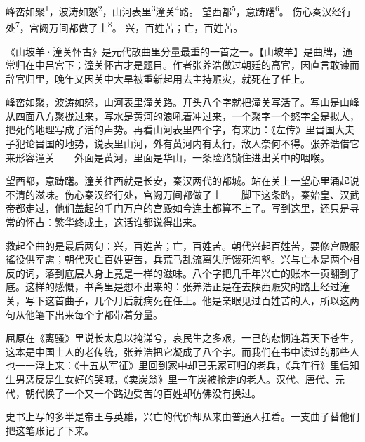 
\begin{poem}
峰峦如聚\textsuperscript{1}，波涛如怒\textsuperscript{2}，山河表里\textsuperscript{3}潼关\textsuperscript{4}路。
望西都\textsuperscript{5}，意踌躇\textsuperscript{6}。
伤心秦汉经行处\textsuperscript{7}，宫阙万间都做了土\textsuperscript{8}。
兴，百姓苦；亡，百姓苦。
\end{poem}

\begin{annotations}
\end{annotations}

\begin{appreciation}
《山坡羊·潼关怀古》是元代散曲里分量最重的一首之一。【山坡羊】是曲牌，通常归在中吕宫下；潼关怀古才是题目。作者张养浩做过朝廷的高官，因直言敢谏而辞官归里，晚年又因关中大旱被重新起用去主持赈灾，就死在了任上。

峰峦如聚，波涛如怒，山河表里潼关路。开头八个字就把潼关写活了。写山是山峰从四面八方聚拢过来，写水是黄河的浪吼着冲过来，一个聚字一个怒字全是拟人，把死的地理写成了活的声势。再看山河表里四个字，有来历：《左传》里晋国大夫子犯论晋国的地势，说表里山河，外有黄河内有太行，敌人奈何不得。张养浩借它来形容潼关——外面是黄河，里面是华山，一条险路锁住进出关中的咽喉。

望西都，意踌躇。潼关往西就是长安，秦汉两代的都城。站在关上一望心里涌起说不清的滋味。伤心秦汉经行处，宫阙万间都做了土——脚下这条路，秦始皇、汉武帝都走过，他们盖起的千门万户的宫殿如今连土都算不上了。写到这里，还只是寻常的怀古：繁华终成土，这话谁都说得出来。

救起全曲的是最后两句：兴，百姓苦；亡，百姓苦。朝代兴起百姓苦，要修宫殿服徭役供军需；朝代灭亡百姓更苦，兵荒马乱流离失所饿死沟壑。兴与亡本是两个相反的词，落到底层人身上竟是一样的滋味。八个字把几千年兴亡的账本一页翻到了底。这样的感慨，书斋里是想不出来的：张养浩正是在去陕西赈灾的路上经过潼关，写下这首曲子，几个月后就病死在任上。他是亲眼见过百姓苦的人，所以这两句从他笔下出来每个字都带着分量。

屈原在《离骚》里说长太息以掩涕兮，哀民生之多艰，一己的悲悯连着天下苍生，这本是中国士人的老传统，张养浩把它凝成了八个字。而我们在书中读过的那些人也一一浮上来：《十五从军征》里回到家中却已无家可归的老兵，《兵车行》里信知生男恶反是生女好的哭喊，《卖炭翁》里一车炭被抢走的老人。汉代、唐代、元代，朝代换了一个又一个路边受苦的百姓却仿佛没有换过。

史书上写的多半是帝王与英雄，兴亡的代价却从来由普通人扛着。一支曲子替他们把这笔账记了下来。
\end{appreciation}
